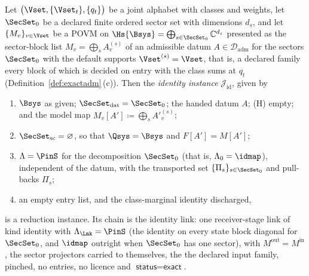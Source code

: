 \begin{corollary}\label{cor:identity-instance}
Let $\big(\Vset,\{\Vset_t\},\{q_t\}\big)$ be a joint alphabet with classes
and weights, let $\SecSet_0$ be a declared finite ordered sector set with
dimensions $d_s$, and let $\{M_v\}_{v\in\Vset}$ be a POVM on
$\Hs{\Bsys}=\bigoplus_{s\in\SecSet_0}\mathbb{C}^{d_s}$ presented as the
sector-block list $M_v=\bigoplus_sA^{(s)}_v$ of an admissible datum
$A\in\mathcal{D}_{\mathrm{adm}}$ for the sectors $\SecSet_0$ with the default
supports $\Vset^{(s)}=\Vset$, that is, a declared family every block of which
is decided  on entry with
the class sums at $q_t$ (Definition~\ref{def:exactadm}\,(c)). Then the
\emph{identity instance} $\mathcal{J}_{\mathrm{id}}$, given by
\begin{enumerate}[label=(I\arabic*),leftmargin=3.0em]
\item $\Bsys$ as given; $\SecSet_{\mathrm{dat}}=\SecSet_0$; the handed datum
  $A$; (H) empty; and the model map $M_v[A']\coloneqq\bigoplus_{s}A'^{(s)}_v$;
\item $\SecSet_{\mathrm{sc}}=\varnothing$, so that $\Qsys=\Bsys$ and
  $F[A']=M[A']$;
\item $\Lambda=\PinS$ for the decomposition $\SecSet_0$ (that is,
  $\Lambda_0=\idmap$), independent of the datum, with the transported set
  $\{\Pi_s\}_{s\in\SecSet_0}$ and pull-backs $\Pi_s$;
\item an empty entry list, and the class-marginal identity
  discharged,
\end{enumerate}
is a reduction instance. Its chain is the identity link: one receiver-stage
link of kind
\textsf{identity} with $\Lambda_{\Lnk}=\PinS$ (the identity on every state
block diagonal for $\SecSet_0$, and $\idmap$ outright when $\SecSet_0$ has one
sector), with $M^{\mathrm{out}}=M^{\mathrm{in}}$, the sector projectors
carried to themselves, the  the declared input
family, pinched, no entries, no licence and
$\textsf{status}=\textsf{exact}$.
\end{corollary}

